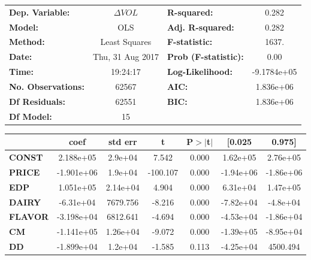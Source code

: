 \begin{center}
\begin{tabular}{lclc}
\toprule
\textbf{Dep. Variable:}    &        $\Delta VOL$        & \textbf{  R-squared:         } &      0.282    \\
\textbf{Model:}            &       OLS        & \textbf{  Adj. R-squared:    } &      0.282    \\
\textbf{Method:}           &  Least Squares   & \textbf{  F-statistic:       } &      1637.    \\
\textbf{Date:}             & Thu, 31 Aug 2017 & \textbf{  Prob (F-statistic):} &      0.00     \\
\textbf{Time:}             &     19:24:17     & \textbf{  Log-Likelihood:    } & -9.1784e+05   \\
\textbf{No. Observations:} &       62567      & \textbf{  AIC:               } &  1.836e+06    \\
\textbf{Df Residuals:}     &       62551      & \textbf{  BIC:               } &  1.836e+06    \\
\textbf{Df Model:}         &          15      & \textbf{                     } &               \\
\bottomrule
\end{tabular}
\begin{tabular}{lcccccc}
               & \textbf{coef} & \textbf{std err} & \textbf{t} & \textbf{P$>$$|$t$|$} & \textbf{[0.025} & \textbf{0.975]}  \\
\midrule
\textbf{CONST} &    2.188e+05  &      2.9e+04     &     7.542  &         0.000        &     1.62e+05    &     2.76e+05     \\
\textbf{PRICE}    &   -1.901e+06  &      1.9e+04     &  -100.107  &         0.000        &    -1.94e+06    &    -1.86e+06     \\
\textbf{EDP}    &    1.051e+05  &     2.14e+04     &     4.904  &         0.000        &     6.31e+04    &     1.47e+05     \\
\textbf{DAIRY}    &    -6.31e+04  &     7679.756     &    -8.216  &         0.000        &    -7.82e+04    &     -4.8e+04     \\
\textbf{FLAVOR}    &   -3.198e+04  &     6812.641     &    -4.694  &         0.000        &    -4.53e+04    &    -1.86e+04     \\
\textbf{CM}    &   -1.141e+05  &     1.26e+04     &    -9.072  &         0.000        &    -1.39e+05    &    -8.95e+04     \\
\textbf{DD}    &   -1.899e+04  &      1.2e+04     &    -1.585  &         0.113        &    -4.25e+04    &     4500.494     \\

\end{tabular}
\end{center}
